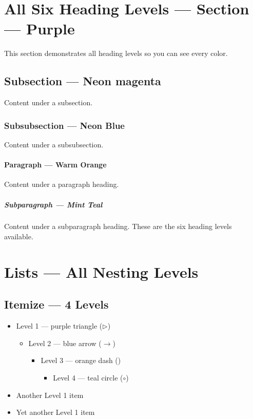 \documentclass[main.tex]{subfiles}
\begin{document}
\section{All Six Heading Levels — Section — Purple}

This section demonstrates all heading levels so you can see every color.

\subsection{Subsection — Neon magenta}

Content under a subsection.

\subsubsection{Subsubsection — Neon Blue}

Content under a subsubsection.

\paragraph{Paragraph — Warm Orange}

Content under a paragraph heading.

\subparagraph{Subparagraph — Mint Teal}

Content under a subparagraph heading. These are the six heading levels available.

\section{Lists — All Nesting Levels}

\subsection{Itemize — 4 Levels}

\begin{itemize}
    \item Level 1 — purple triangle ($\triangleright$)
    \begin{itemize}
        \item Level 2 — blue arrow ($\rightarrow$)
        \begin{itemize}
            \item Level 3 — orange dash (\textendash)
            \begin{itemize}
                \item Level 4 — teal circle ($\circ$)
            \end{itemize}
        \end{itemize}
    \end{itemize}
    \item Another Level 1 item
    \item Yet another Level 1 item
\end{itemize}
\end{document}
